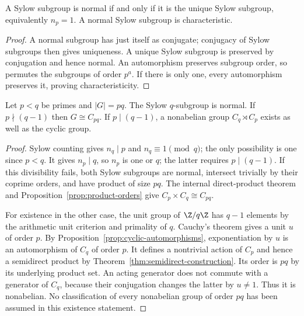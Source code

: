 \begin{corollary}\label{cor:sylow-normal}
A Sylow subgroup is normal if and only if it is the unique Sylow subgroup, equivalently $n_p=1$. A normal Sylow subgroup is characteristic.
\end{corollary}
\begin{proof}
A normal subgroup has just itself as conjugate; conjugacy of Sylow subgroups then gives uniqueness. A unique Sylow subgroup is preserved by conjugation and hence normal. An automorphism preserves subgroup order, so permutes the subgroups of order $p^a$. If there is only one, every automorphism preserves it, proving characteristicity.
\end{proof}

\begin{proposition}\label{prop:order-pq}
Let $p<q$ be primes and $|G|=pq$. The Sylow $q$-subgroup is normal. If $p\nmid(q-1)$ then $G\cong C_{pq}$. If $p\mid(q-1)$, a nonabelian group $C_q\rtimes C_p$ exists as well as the cyclic group.
\end{proposition}
\begin{proof}
Sylow counting gives $n_q\mid p$ and $n_q\equiv1\pmod q$; the only possibility is one since $p<q$. It gives $n_p\mid q$, so $n_p$ is one or $q$; the latter requires $p\mid(q-1)$. If this divisibility fails, both Sylow subgroups are normal, intersect trivially by their coprime orders, and have product of size $pq$. The internal direct-product theorem and Proposition~\ref{prop:product-orders} give $C_p\times C_q\cong C_{pq}$.

For existence in the other case, the unit group of $\Z/q\Z$ has $q-1$ elements by the arithmetic unit criterion and primality of $q$. Cauchy's theorem gives a unit $u$ of order $p$. By Proposition~\ref{prop:cyclic-automorphisms}, exponentiation by $u$ is an automorphism of $C_q$ of order $p$. It defines a nontrivial action of $C_p$ and hence a semidirect product by Theorem~\ref{thm:semidirect-construction}. Its order is $pq$ by its underlying product set. An acting generator does not commute with a generator of $C_q$, because their conjugation changes the latter by $u\ne1$. Thus it is nonabelian. No classification of every nonabelian group of order $pq$ has been assumed in this existence statement.
\end{proof}

